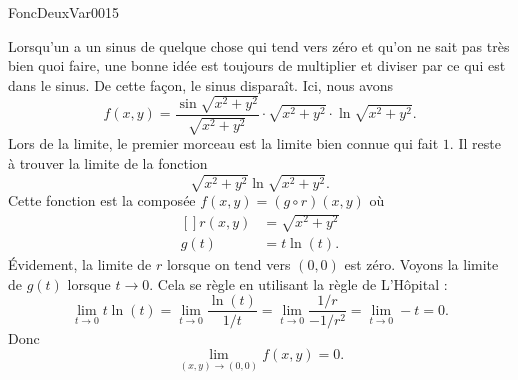 

\begin{corrige}{FoncDeuxVar0015}

	Lorsqu'un a un sinus de quelque chose qui tend vers zéro et qu'on ne sait pas très bien quoi faire, une bonne idée est toujours de multiplier et diviser par ce qui est dans le sinus. De cette façon, le sinus disparaît. Ici, nous avons
	\begin{equation}
		f(x,y)=\frac{ \sin\sqrt{x^2+y^2} }{ \sqrt{x^2+y^2} }\cdot\sqrt{x^2+y^2}\cdot\ln\sqrt{x^2+y^2}.
	\end{equation}
	Lors de la limite, le premier morceau est la limite bien connue qui fait $1$. Il reste à trouver la limite de la fonction
	\begin{equation}
		\sqrt{x^2+y^2}\ln\sqrt{x^2+y^2}.
	\end{equation}
	Cette fonction est la composée $f(x,y)=(g\circ r)(x,y)$ où
	\begin{equation}
		\begin{aligned}[]
			r(x,y)&=\sqrt{x^2+y^2}\\
			g(t)&=t\ln(t).
		\end{aligned}
	\end{equation}
	Évidement, la limite de $r$ lorsque on tend vers $(0,0)$ est zéro. Voyons la limite de $g(t)$ lorsque $t\to 0$. Cela se règle en utilisant la règle de L'Hôpital :
	\begin{equation}
		\lim_{t\to 0}t\ln(t)=\lim_{t\to 0}\frac{ \ln(t) }{ 1/t }=\lim_{t\to 0}\frac{ 1/r }{ -1/r^2 }=\lim_{t\to0}-t=0.
	\end{equation}
	Donc
	\begin{equation}
		\lim_{(x,y)\to(0,0)}f(x,y)=0.
	\end{equation}

\end{corrige}
